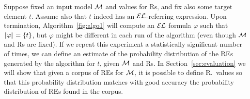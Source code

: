 Suppose fixed an input model $\mathcal{M}$ and values for Rs, and fix also some target element $t$.  Assume also that $t$ indeed has an $\mathcal{EL}$-referring expression.  Upon termination, Algorithm~\ref{fig:algo1} will compute an $\mathcal{EL}$ formula $\varphi$ such that $|\!|\varphi|\!| = \{t\}$, but $\varphi$ might be different in each run of the algorithm (even though $\mathcal{M}$ and Rs are fixed).  If we repeat this experiment a statistically significant number of times, we can define an estimate of the probability distribution of the REs generated by the algorithm for $t$, given $\mathcal{M}$ and Rs. In Section~\ref{sec:evaluation} we will show that given a corpus of REs for $\mathcal{M}$, it is possible to define R.\puse\ values so that this probability distribution matches with good accuracy the probability distribution of REs found in the corpus.  




